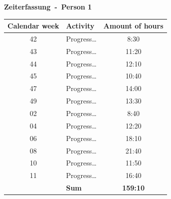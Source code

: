 \textbf{\huge Zeiterfassung~-~Person 1}

\begin{table}[H]
    \centering
    \begin{tabularx}{\textwidth}{|c|X|c|} %
        \hline %
        Calendar week & Activity & Amount of hours \\
        \hline %
        42            & Progress\dots & 8:30            \\
        \hline %
        43            & Progress\dots & 11:20           \\
        \hline %
        44            & Progress\dots & 12:10           \\
        \hline %
        45            & Progress\dots & 10:40           \\
        \hline %
        47            & Progress\dots & 14:00           \\
        \hline %
        49            & Progress\dots & 13:30           \\
        \hline %
        02            & Progress\dots & 8:40            \\
        \hline %
        04            & Progress\dots & 12:20           \\
        \hline %
        06            & Progress\dots & 18:10           \\
        \hline %
        08            & Progress\dots & 21:40           \\
        \hline %
        10            & Progress\dots & 11:50           \\
        \hline %
        11            & Progress\dots & 16:40           \\
        \hline %
                      & \textbf{Sum} & \textbf{159:10} \\
        \hline %
    \end{tabularx}
\end{table}
